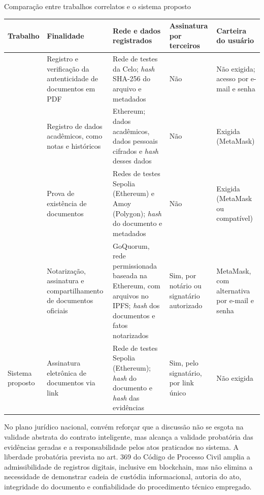 \documentclass[
    12pt,
    a4paper,
    oneside,
    chapter=TITLE,
    section=TITLE,
    subsection=TITLE,
    subsubsection=TITLE,
    sumario=tradicional,
    english,
    brazil
]{abntex2}
\begin{document}
\begin{quadro}[htbp]
    \caption{Comparação entre trabalhos correlatos e o sistema proposto}
    \label{quadro:correlatos}
    \centering
    \small
    \begin{tabular}{L{2.4cm}L{3.0cm}L{3.6cm}L{2.2cm}L{2.6cm}}
        \toprule
        \textbf{Trabalho} & \textbf{Finalidade} & \textbf{Rede e dados registrados} & \textbf{Assinatura por terceiros} & \textbf{Carteira do usuário} \\
        \midrule
         & Registro e verificação da autenticidade de documentos em PDF & Rede de testes da Celo; \emph{hash} SHA-256 do arquivo e metadados & Não & Não exigida; acesso por e-mail e senha \\
        \addlinespace
         & Registro de dados acadêmicos, como notas e históricos & Ethereum; dados acadêmicos, dados pessoais cifrados e \emph{hash} desses dados & Não & Exigida (MetaMask) \\
        \addlinespace
         & Prova de existência de documentos & Redes de testes Sepolia (Ethereum) e Amoy (Polygon); \emph{hash} do documento e metadados & Não & Exigida (MetaMask ou compatível) \\
        \addlinespace
         & Notarização, assinatura e compartilhamento de documentos oficiais & GoQuorum, rede permissionada baseada na Ethereum, com arquivos no IPFS; \emph{hash} dos documentos e fatos notarizados & Sim, por notário ou signatário autorizado & MetaMask, com alternativa por e-mail e senha \\
        \addlinespace
        Sistema proposto & Assinatura eletrônica de documentos via link & Rede de testes Sepolia (Ethereum); \emph{hash} do documento e \emph{hash} das evidências & Sim, pelo signatário, por link único & Não exigida \\
        \bottomrule
    \end{tabular}
\end{quadro}
\FloatBarrier

No plano jurídico nacional, convém reforçar que a discussão não se
esgota na validade abstrata do contrato inteligente, mas alcança a
validade probatória das evidências geradas e a responsabilidade pelos
atos praticados no sistema. A liberdade probatória prevista no art.
369 do Código de Processo Civil \cite{brasil2015} amplia a admissibilidade de registros
digitais, inclusive em blockchain, mas não elimina a necessidade de
demonstrar cadeia de custódia informacional, autoria do ato,
integridade do documento e confiabilidade do procedimento técnico
empregado.
\end{document}
